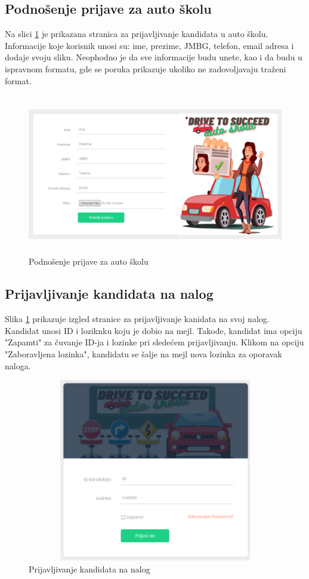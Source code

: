 \subsection{Podnošenje prijave za auto školu}

Na slici  \ref{fig:ui_registracija} je prikazana stranica za prijavljivanje kandidata u auto školu. 
Informacije koje korisnik unosi su: ime, prezime, JMBG, telefon, email adresa i dodaje svoju sliku. 
Neophodno je da sve informacije budu unete, kao i da budu u ispravnom formatu, gde se poruka prikazuje ukoliko ne zadovoljavaju traženi format.

\begin{figure}[H]
  \begin{center}
      \includegraphics[width=140mm, height=70mm]{UI/UI_registracija.png}
  \end{center}
  \caption {Podnošenje prijave za auto školu}
  \label{fig:ui_registracija}

\end{figure}

\subsection{Prijavljivanje kandidata na nalog}

Slika \ref{fig:ui_registracija} prikazuje izgled stranice za prijavljivanje kanidata na svoj nalog. 
Kandidat unosi ID i loziknku koju je dobio na mejl. Takođe, kandidat ima opciju "Zapamti" za čuvanje ID-ja i lozinke pri sledećem prijavljivanju.
Klikom na opciju "Zaboravljena lozinka", kandidatu se šalje na mejl nova lozinka za oporavak naloga. 

\begin{figure}[H]
  \begin{center}
      \includegraphics[width=140mm, height=80mm]{UI/UI_login.png}
  \end{center}
  \caption {Prijavljivanje kandidata na nalog}
  \label{fig:ui_login}

\end{figure}
